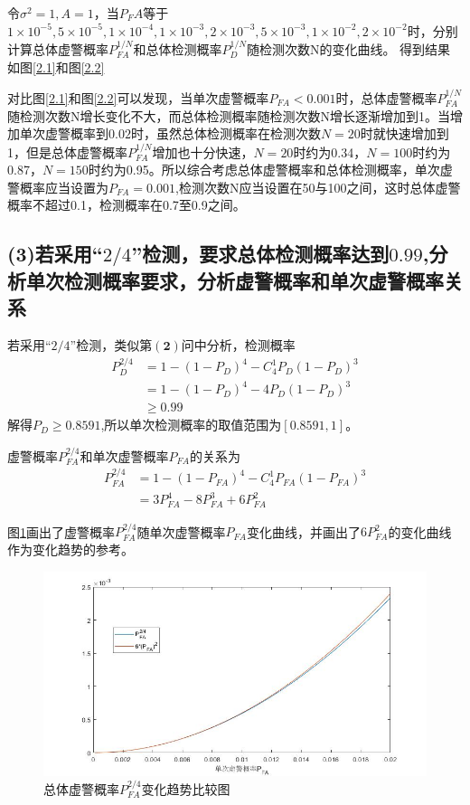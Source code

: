 \documentclass[fontset=windows]{article}
\numberwithin{figure}{section}
\begin{document}
令\(\sigma^2=1,A=1\)，当\(P_FA\)等于\(1\times10^{-5},5\times10^{-5},1\times10^{-4},1\times10^{-3},2\times10^{-3},5\times10^{-3},1\times10^{-2},2\times10^{-2}\)时，分别计算总体虚警概率\(P^{1/N}_{FA}\)和总体检测概率\(P^{1/N}_D\)随检测次数N的变化曲线。
得到结果如图\ref*{2.1}和图\ref*{2.2}

对比图\ref*{2.1}和图\ref*{2.2}可以发现，当单次虚警概率\(P_{FA}<0.001\)时，总体虚警概率\(P^{1/N}_{FA}\)随检测次数N增长变化不大，而总体检测概率随检测次数N增长逐渐增加到1。当增加单次虚警概率到\(0.02\)时，虽然总体检测概率在检测次数\(N=20\)时就快速增加到1，但是总体虚警概率\(P^{1/N}_{FA}\)增加也十分快速，\(N=20\)时约为0.34，\(N=100\)时约为0.87，\(N=150\)时约为0.95。所以综合考虑总体虚警概率和总体检测概率，单次虚警概率应当设置为\(P_{FA}=0.001\),检测次数N应当设置在50与100之间，这时总体虚警概率不超过0.1，检测概率在0.7至0.9之间。

\subsection*{(3)若采用“\(2/4\)”检测，要求总体检测概率达到\(0.99\),分析单次检测概率要求，分析虚警概率和单次虚警概率关系}

若采用“\(2/4\)”检测，类似第\(\mathbf{(2)}\)问中分析，检测概率
\begin{align*}
    P^{2/4}_D & =1-(1-P_D)^4-C_4^1P_D(1-P_D)^3 \\
              & =1-(1-P_D)^4-4P_D(1-P_D)^3     \\
              & \geqslant0.99
\end{align*}
解得\(P_D\geqslant 0.8591\),所以单次检测概率的取值范围为\([0.8591,1]\)。

虚警概率\(P^{2/4}_{FA}\)和单次虚警概率\(P_{FA}\)的关系为
\begin{align*}
    P^{2/4}_{FA} & =1-(1-P_{FA})^4-C_4^1P_{FA}(1-P_{FA})^3 \\
                 & =3P_{FA}^4-8P_{FA}^3+6P_{FA}^2
\end{align*}

图\ref*{2.3}画出了虚警概率\(P^{2/4}_{FA}\)随单次虚警概率\(P_{FA}\)变化曲线，并画出了\(6P_{FA}^2\)的变化曲线作为变化趋势的参考。
\begin{figure}[H]
    \centering
    \includegraphics[scale=0.5]{fig2_3.jpg}
    \caption{总体虚警概率\(P^{2/4}_{FA}\)变化趋势比较图}
    \label{2.3}
\end{figure}
\end{document}
